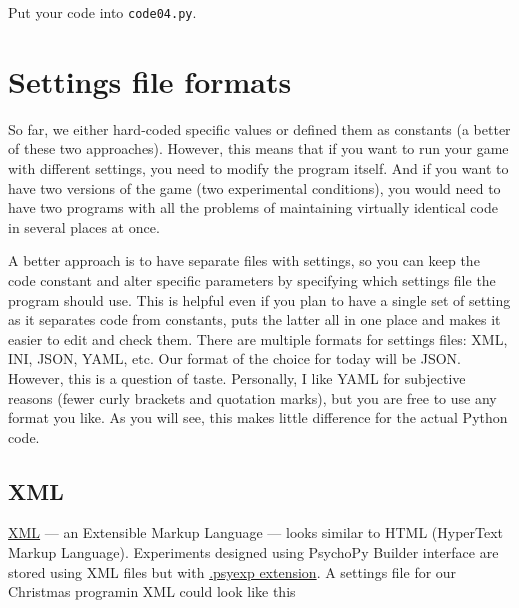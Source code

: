 \documentclass[
]{book}
\begin{document}
Put your code into \texttt{code04.py}.

\hypertarget{settings-files}{%
\section{Settings file formats}\label{settings-files}}

So far, we either hard-coded specific values or defined them as constants (a better of these two approaches). However, this means that if you want to run your game with different settings, you need to modify the program itself. And if you want to have two versions of the game (two experimental conditions), you would need to have two programs with all the problems of maintaining virtually identical code in several places at once.

A better approach is to have separate files with settings, so you can keep the code constant and alter specific parameters by specifying which settings file the program should use. This is helpful even if you plan to have a single set of setting as it separates code from constants, puts the latter all in one place and makes it easier to edit and check them. There are multiple formats for settings files: XML, INI, JSON, YAML, etc. Our format of the choice for today will be JSON. However, this is a question of taste. Personally, I like YAML for subjective reasons (fewer curly brackets and quotation marks), but you are free to use any format you like. As you will see, this makes little difference for the actual Python code.

\hypertarget{xml}{%
\subsection{XML}\label{xml}}

\href{https://en.wikipedia.org/wiki/XML}{XML} --- an Extensible Markup Language --- looks similar to HTML (HyperText Markup Language). Experiments designed using PsychoPy Builder interface are stored using XML files but with \href{https://www.psychopy.org/psyexp.html}{.psyexp extension}. A settings file for our Christmas programin XML could look like this
\end{document}
